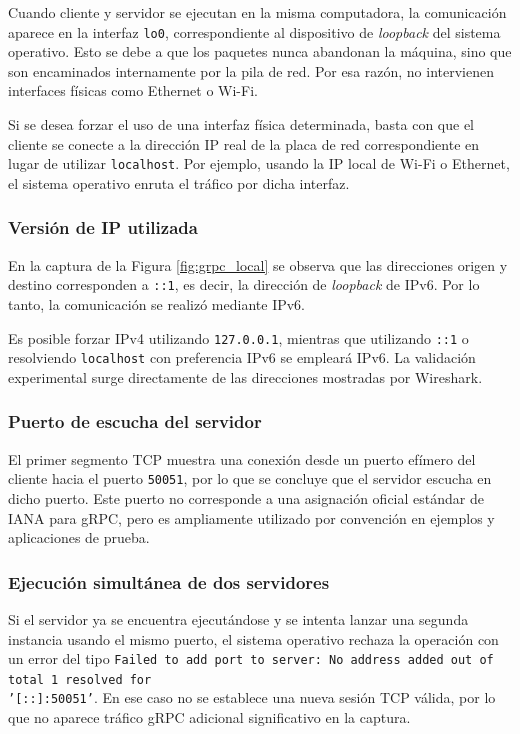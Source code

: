 \documentclass[a4paper,12pt]{article}
\begin{document}
Cuando cliente y servidor se ejecutan en la misma computadora, la comunicación aparece en la interfaz \texttt{lo0}, correspondiente al dispositivo de \textit{loopback} del sistema operativo. Esto se debe a que los paquetes nunca abandonan la máquina, sino que son encaminados internamente por la pila de red. Por esa razón, no intervienen interfaces físicas como Ethernet o Wi-Fi.

Si se desea forzar el uso de una interfaz física determinada, basta con que el cliente se conecte a la dirección IP real de la placa de red correspondiente en lugar de utilizar \texttt{localhost}. Por ejemplo, usando la IP local de Wi-Fi o Ethernet, el sistema operativo enruta el tráfico por dicha interfaz.

\subsubsection{Versión de IP utilizada}

En la captura de la Figura \ref{fig:grpc_local} se observa que las direcciones origen y destino corresponden a \texttt{::1}, es decir, la dirección de \textit{loopback} de IPv6. Por lo tanto, la comunicación se realizó mediante IPv6.

Es posible forzar IPv4 utilizando \texttt{127.0.0.1}, mientras que utilizando \texttt{::1} o resolviendo \texttt{localhost} con preferencia IPv6 se empleará IPv6. La validación experimental surge directamente de las direcciones mostradas por Wireshark.

\subsubsection{Puerto de escucha del servidor}

El primer segmento TCP muestra una conexión desde un puerto efímero del cliente hacia el puerto \texttt{50051}, por lo que se concluye que el servidor escucha en dicho puerto. Este puerto no corresponde a una asignación oficial estándar de IANA para gRPC, pero es ampliamente utilizado por convención en ejemplos y aplicaciones de prueba.

\subsubsection{Ejecución simultánea de dos servidores}

Si el servidor ya se encuentra ejecutándose y se intenta lanzar una segunda instancia usando el mismo puerto, el sistema operativo rechaza la operación con un error del tipo \texttt{Failed to add port to server: No address added out of total 1 resolved for \\ '[::]:50051'}. En ese caso no se establece una nueva sesión TCP válida, por lo que no aparece tráfico gRPC adicional significativo en la captura.
\end{document}
